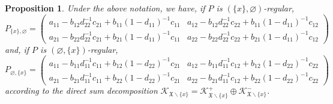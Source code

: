 \documentclass[pdftex]{sigma}
\numberwithin{equation}{section}
\newtheorem{Proposition}[Theorem]{Proposition}
 { \theoremstyle{definition}
\newtheorem{Definition}[Theorem]{Definition}
\newtheorem{Example}[Theorem]{Example}
\newtheorem{Remark}[Theorem]{Remark} }
\newcommand{\mfrak}[1]{\mathfrak{#1}}
\newcommand{\mcal}[1]{\mathcal{#1}}
\begin{document}
\begin{Proposition}\label{prop:expression_cond_proj}
Under the above notation, we have, if $P$ is $(\{x\},\varnothing)$-regular,
\begin{equation*}
	P_{\{x\},\varnothing}=\left(
	\begin{matrix}
		a_{11}-b_{12}d_{22}^{-1}c_{21}+b_{11}(1-d_{11})^{-1}c_{11} & a_{12}-b_{12}d_{22}^{-1}c_{22}+b_{11}(1-d_{11})^{-1}c_{12}\\
		a_{21}-b_{22}d_{22}^{-1}c_{21}+b_{21}(1-d_{11})^{-1}c_{11} & a_{22}-b_{22}d_{22}^{-1}c_{22}+b_{21}(1-d_{11})^{-1}c_{12}
	\end{matrix}
	\right)
\end{equation*}
and, if $P$ is $(\varnothing,\{x\})$-regular,
\begin{equation*}
	P_{\varnothing,\{x\}}=\left(
	\begin{matrix}
		a_{11}-b_{11}d_{11}^{-1}c_{11}+b_{12}(1-d_{22})^{-1}c_{21} & a_{12}-b_{11}d_{11}^{-1}c_{12}+b_{12}(1-d_{22})^{-1}c_{22}\\
		a_{21}-b_{21}d_{11}^{-1}c_{11}+b_{22}(1-d_{22})^{-1}c_{21} & a_{22}-b_{21}d_{11}^{-1}c_{12}+b_{22}(1-d_{22})^{-1}c_{22}
	\end{matrix}
	\right)
\end{equation*}
according to the direct sum decomposition $\mcal{K}_{\mfrak{X}\backslash\{x\}}=\mcal{K}^{+}_{\mfrak{X}\backslash\{x\}}\oplus \mcal{K}^{-}_{\mfrak{X}\backslash\{x\}}$.
\end{Proposition}
\end{document}
